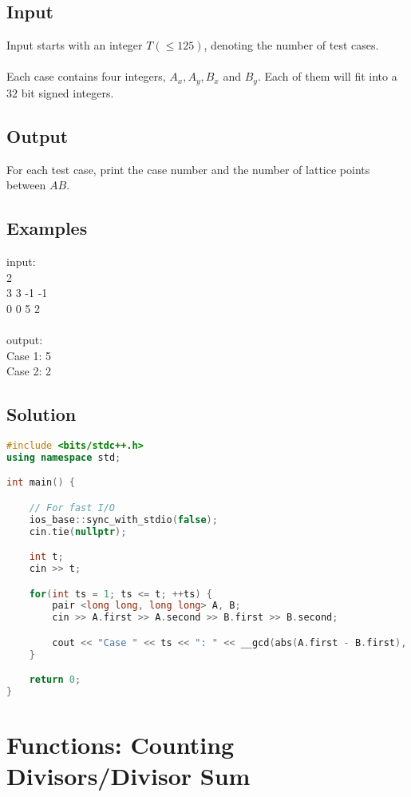 \documentclass[10pt,a4paper]{article}
\begin{document}
\begin{itemize}
\subsection*{Input}
Input starts with an integer $T (\leq 125)$, denoting the number of test cases.
\\ \\
Each case contains four integers, $A_x, A_y, B_x$ and $B_y$. Each of them will fit into a $32$ bit signed integers.

\subsection*{Output}
For each test case, print the case number and the number of lattice points between $AB$.

\subsection*{Examples}
input: \\
2 \\
3 3 -1 -1 \\
0 0 5 2 \\
 \\
output: \\
Case 1: 5 \\
Case 2: 2 

\subsection*{Solution}

\begin{lstlisting}[language=C++, caption={How Many Points?},label={1st:code}, mathescape=true, breaklines=true]
#include <bits/stdc++.h>
using namespace std;

int main() {

    // For fast I/O
    ios_base::sync_with_stdio(false);
    cin.tie(nullptr);

    int t;
    cin >> t;

    for(int ts = 1; ts <= t; ++ts) {
        pair <long long, long long> A, B;
        cin >> A.first >> A.second >> B.first >> B.second;

        cout << "Case " << ts << ": " << __gcd(abs(A.first - B.first), abs(A.second - B.second)) + 1 << '\n';
    }

    return 0;
}
\end{lstlisting}


\section{Functions: Counting Divisors/Divisor Sum}


\end{itemize}
\end{document}
